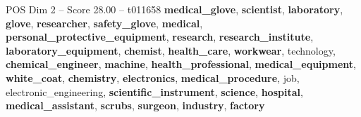 \begin{textsample}{POS Dim 2 – Score 28.00 – t011658}  \label{ex:f2_pos_035}
\textbf{medical\_glove}, \textbf{scientist}, \textbf{laboratory}, \textbf{glove}, \textbf{researcher}, \textbf{safety\_glove}, \textbf{medical}, \textbf{personal\_protective\_equipment}, \textbf{research}, \textbf{research\_institute}, \textbf{laboratory\_equipment}, \textbf{chemist}, \textbf{health\_care}, \textbf{workwear}, technology, \textbf{chemical\_engineer}, \textbf{machine}, \textbf{health\_professional}, \textbf{medical\_equipment}, \textbf{white\_coat}, \textbf{chemistry}, \textbf{electronics}, \textbf{medical\_procedure}, job, electronic\_engineering, \textbf{scientific\_instrument}, \textbf{science}, \textbf{hospital}, \textbf{medical\_assistant}, \textbf{scrubs}, \textbf{surgeon}, \textbf{industry}, \textbf{factory}

\end{textsample}

